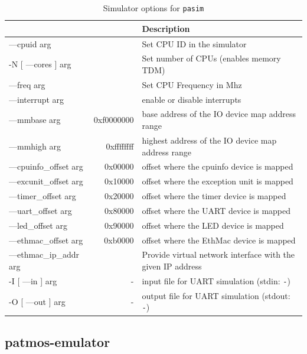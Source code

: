 \documentclass[a4paper,fontsize=10pt,twoside,DIV15,BCOR12mm,headinclude=true,footinclude=false,pagesize,bibtotoc]{scrbook}
\begin{document}
\begin{table}
  \centering
  \caption{Simulator options for \texttt{pasim}}
  \label{tab:pasimopts_sim}
  \begin{tabular}{>{\ttfamily}l<{}>{\ttfamily}r<{}p{}}
    \toprule
    \multicolumn{1}{l}{Option} & \multicolumn{1}{l}{Default} & Description \\
    \midrule
   ---cpuid arg           & 0          & Set CPU ID in the simulator \\
   -N [ ---cores ] arg    & 1          & Set number of CPUs (enables memory TDM) \\
   ---freq arg            & 80         & Set CPU Frequency in Mhz \\
   ---interrupt arg       & 1          & enable or disable interrupts \\
   ---mmbase arg          & 0xf0000000 & base address of the IO device map address range \\
   ---mmhigh arg          & 0xffffffff & highest address of the IO device map address range \\
   ---cpuinfo\_offset arg & 0x00000    & offset where the cpuinfo device is mapped \\
   ---excunit\_offset arg & 0x10000    & offset where the exception unit is mapped \\
   ---timer\_offset arg   & 0x20000    & offset where the timer device is mapped \\
   ---uart\_offset arg    & 0x80000    & offset where the UART device is mapped \\
   ---led\_offset arg     & 0x90000    & offset where the LED device is mapped \\
   ---ethmac\_offset arg  & 0xb0000    & offset where the EthMac device is mapped \\
   ---ethmac\_ip\_addr arg &           & Provide virtual network interface with the given IP address \\
   -I [ ---in ] arg       & -          & input file for UART simulation (stdin: \texttt{-}) \\
   -O [ ---out ] arg      & -          & output file for UART simulation (stdout: \texttt{-}) \\
    \bottomrule
  \end{tabular}
\end{table}

\subsection{patmos-emulator}
\end{document}
